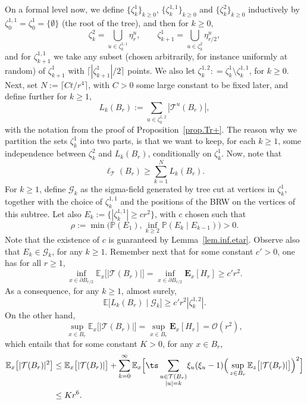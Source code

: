 On a formal level now, we define $\{\zeta_k^1\}_{k\ge 0}$,
$\{\zeta_k^{1,1}\}_{k\ge 0}$ and $\{\zeta_k^2\}_{k\ge 0}$ inductively by
$\zeta_0^{1,1} = \zeta_0^1 = \{\emptyset\}$ (the root of the tree), and then for $k\ge 0$,
\[
\zeta_k^2 = \bigcup_{u\in \zeta_k^{1,1}}
\eta^u_r, \qquad \zeta_{k+1}^1 = \bigcup_{u\in \zeta_k^2}
\eta^u_{r/2},
\]
and for $\zeta_{k+1}^{1,1}$ we take any subset (chosen arbitrarily, for instance uniformly at random) of $\zeta_{k+1}^1$
with $\lceil |\zeta_{k+1}^1|/2\rceil$ points. We also let $\zeta_k^{1,2}: = \zeta_k^1\setminus \zeta_k^{1,1}$, for $k\ge 0$.
Next, set $N:=\lceil Ct/r^4\rceil$, with $C>0$ some large constant to be fixed later, and define further for $k\ge 1$,
\[
L_k(B_r):= \sum_{u\in \zeta_k^{1,2}} |\mathcal T^u(B_r)|,
\]
with the notation from the proof of Proposition~\ref{prop.Tr+}. The reason why we partition the sets $\zeta_k^1$ into two parts, is that we want to keep,
for each $k\ge 1$, some independence between $\zeta_k^2$ and $L_k(B_r)$, conditionally on $\zeta_k^1$.
Now, note that
\begin{equation}\label{ellinfty}
\ell_{\mathcal T}(B_r) \ge \sum_{k=1}^N L_k(B_r).
\end{equation}
For $k\ge 1$, define $\mathcal G_k$ as the sigma-field generated by tree cut at vertices in $\zeta_k^1$, together with the choice of $\zeta_k^{1,1}$ and the positions of the BRW on the vertices of this subtree. Let also $E_k:=\{|\zeta_k^{1,1}|\ge cr^2\}$, with $c$ chosen such that
\begin{equation}\label{rho.def}
\rho:=\min\Big(\mathbb P(E_1), \inf_{k\ge 2} \mathbb P(E_k\mid E_{k-1})\Big)>0.
\end{equation}
Note that the existence of $c$ is
guaranteed by Lemma~\ref{lem.inf.etar}. Observe also that $E_k\in \mathcal G_k$, for any $k\ge 1$.
Remember next that for some constant $c'>0$, one has for all $r\ge 1$,
\[
\inf_{x\in \partial B_{r/2}} \mathbb E_x\big[|\mathcal T(B_r)|\big] = \inf_{x\in \partial B_{r/2}} \mathbf E_x[H_r]\ge c'r^2.
\]
As a consequence, for any $k\ge 1$, almost surely,
\[
\mathbb E \big[L_k(B_r)\mid \mathcal G_k]\ge c'r^2|\zeta_k^{1,2}|.
\]
On the other hand,
\[
\sup_{x\in B_r} \mathbb E_x\big[|\mathcal T(B_r)|\big] =\sup_{x\in B_r} \mathbf E_x[H_r] = \mathcal O(r^2),
\]
which entails that for some constant $K>0$, for any $x\in B_r$,
\begin{align*}
\mathbb E_x\big[|\mathcal T(B_r)|^2\big]
&\le \mathbb E_x \big[|\mathcal T(B_r)|\big]
+ \sum_{k=0}^\infty \mathbb E_x\Big[{\ts\sum_{\substack{u\in \mathcal T(B_r) \\ |u|=k}}} \xi_u(\xi_u-1)\Big(\sup_{z\in B_r}
\mathbb E_z\big[|\mathcal T(B_r)|\big]\Big)^2\Big]\\
&\le Kr^6.
\end{align*}
